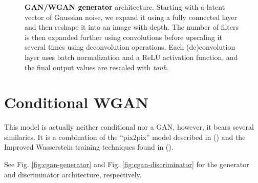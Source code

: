 \documentclass[twoside,11pt,a4paper]{article}
\begin{document}
\begin{figure}
\begin{center}
\begin{tabular}{l||l|l|l}
    \end{tabular}

    
  \end{center}
  \caption{\textbf{GAN/WGAN generator} architecture. Starting with a latent vector of Gaussian noise, we expand it using a fully connected layer and then reshape it into an image with depth. The number of filters is then expanded further using convolutions before upscaling it several times using deconvolution operations. Each (de)convolution layer uses batch normalization and a ReLU activation function, and the final output values are rescaled with \emph{tanh}.}
  \label{fig:gan-generator}
\end{figure}






\section{Conditional WGAN}

This model is actually neither conditional nor a GAN, however, it bears several similaries. It is a combination of the ``pix2pix'' model described in (\cite{isola2016image}) and the Improved Wasserstein training techniques found in (\cite{gulrajani2017improved}).


See Fig. \ref{fig:cgan-generator} and Fig. \ref{fig:cgan-discriminator} for the generator and discriminator architecture, respectively.
\end{document}
